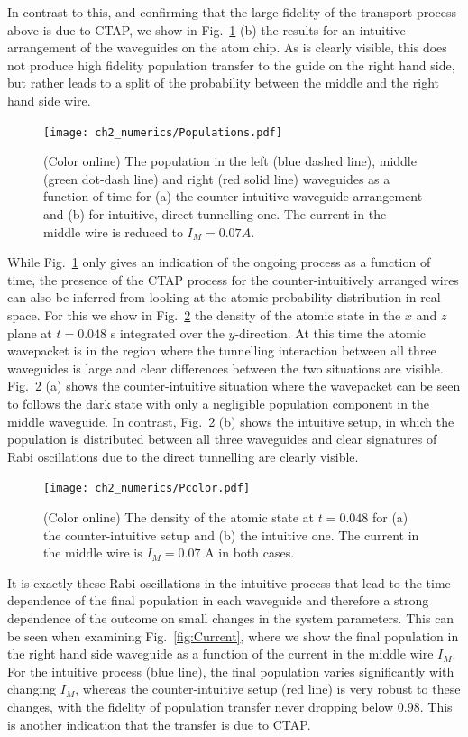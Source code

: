 In contrast to this, and confirming that the large fidelity of the transport process above is due to CTAP, we show in Fig.~\ref{fig:Populations} (b) the results for an intuitive arrangement of the waveguides on the atom chip. As is clearly visible, this does not produce high fidelity population transfer to the guide on the right hand side, but rather leads to a split of the probability between the middle and the right hand side wire. 

\begin{figure}[tb]
  \texttt{[image: ch2\_numerics/Populations.pdf]}
  \caption{(Color online) The population in the left (blue dashed line), middle (green dot-dash line) and right (red solid line) waveguides as a function of time for (a) the counter-intuitive waveguide arrangement and (b) for intuitive, direct tunnelling one. The current in the middle wire is reduced to $I_M=0.07 A$.}
  \label{fig:Populations}
\end{figure}

While Fig.~\ref{fig:Populations} only gives an indication of the ongoing process as a function of time, the presence of the CTAP process for the counter-intuitively arranged wires can also be inferred from looking at the atomic probability distribution in real space. For this we show in Fig.~\ref{fig:Pcolor}  the density of the atomic state in the $x$ and $z$ plane at $t=0.048$ s integrated over the $y$-direction. At this time the atomic wavepacket is in the region where the tunnelling interaction between all three waveguides is large and clear differences between the two situations are visible. Fig.~\ref{fig:Pcolor} (a) shows the counter-intuitive situation where the wavepacket can be seen to follows the dark state with only a negligible population component in the middle waveguide. In contrast, Fig.~\ref{fig:Pcolor} (b) shows the intuitive setup, in which the population is distributed between all three waveguides and clear signatures of Rabi oscillations due to the direct tunnelling are clearly visible.

\begin{figure}[tb]
  \texttt{[image: ch2\_numerics/Pcolor.pdf]}
  \caption{(Color online) The density of the atomic state at $t=0.048$ for (a) the counter-intuitive setup and (b) the intuitive one. The current in the middle wire is $I_M=0.07$ A in both cases.}
  \label{fig:Pcolor}
\end{figure}

It is exactly these Rabi oscillations in the intuitive process that lead to the time-dependence of the final population in each waveguide and therefore a strong dependence of the outcome on small changes in the system parameters. This can be seen when examining Fig.~\ref{fig:Current}, where we show the final population in the right hand side waveguide as a function of the current in the middle wire $I_M$. For the intuitive process (blue line), the final population varies significantly with changing $I_M$, whereas the counter-intuitive setup (red line) is very robust to these changes, with the fidelity of population transfer never dropping below $0.98$. This is another indication that the transfer is due to CTAP. 

